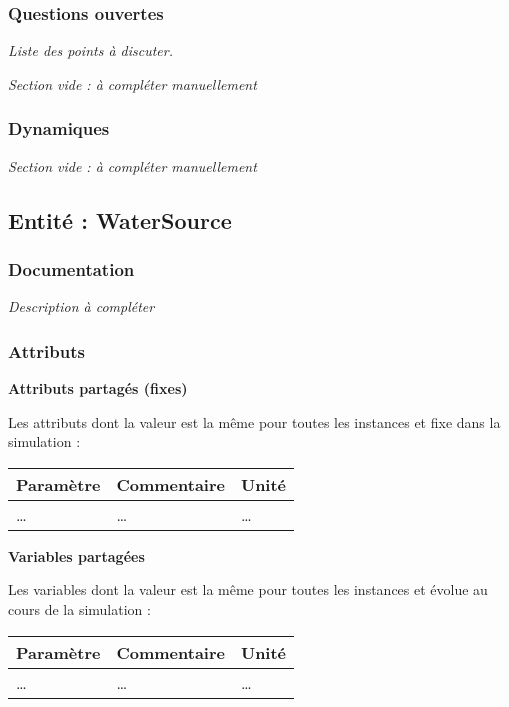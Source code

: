 \documentclass[
]{article}
\begin{document}
\subsubsection{Questions ouvertes}\label{questions-ouvertes-8}

\emph{Liste des points à discuter.}

\emph{Section vide : à compléter manuellement}

\subsubsection{Dynamiques}\label{dynamiques-8}

\emph{Section vide : à compléter manuellement}

\subsection{Entité : WaterSource}\label{entituxe9-watersource}

\subsubsection{Documentation}\label{documentation-13}

\emph{Description à compléter}

\subsubsection{Attributs}\label{attributs-13}

\textbf{Attributs partagés (fixes)}

Les attributs dont la valeur est la même pour toutes les instances et
fixe dans la simulation :

\begin{longtable}[]{@{}lll@{}}
\toprule\noalign{}
\textbf{Paramètre} & \textbf{Commentaire} & \textbf{Unité} \\
\midrule\noalign{}
\endhead
\bottomrule\noalign{}
\endlastfoot
\ldots{} & \ldots{} & \ldots{} \\
\end{longtable}

\textbf{Variables partagées}

Les variables dont la valeur est la même pour toutes les instances et
évolue au cours de la simulation :

\begin{longtable}[]{@{}lll@{}}
\toprule\noalign{}
\textbf{Paramètre} & \textbf{Commentaire} & \textbf{Unité} \\
\midrule\noalign{}
\endhead
\bottomrule\noalign{}
\endlastfoot
\ldots{} & \ldots{} & \ldots{} \\
\end{longtable}
\end{document}
